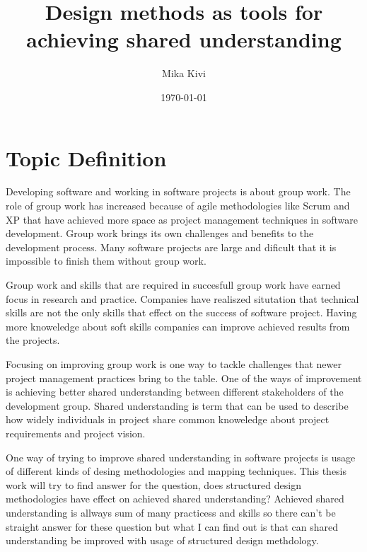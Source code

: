 \documentclass[english]{tktltiki2}
\title{Design methods as tools for achieving shared understanding}
\author{Mika Kivi}
\date{\today}
\theoremstyle{definition}
\theoremstyle{remark}
\begin{document}

\frontmatter      %

\maketitle        %
\makeabstract     %

\tableofcontents  %


\mainmatter       %

\section{Topic Definition}

Developing software and working in software projects is about group work. The role of group work has increased because of agile methodologies like Scrum\cite{scrum} and XP\cite{XP} that have achieved more space as project management techniques in software development. Group work brings its own challenges and benefits to the development process. Many software projects are large and dificult that it is impossible to finish them without group work.

Group work and skills that are required in succesfull group work have earned focus in research and practice. Companies have realiszed situtation that technical skills are not the only skills that effect on the success of software project. Having more knoweledge about soft skills companies can improve achieved results from the projects.

Focusing on improving group work is one way to tackle challenges that newer project management practices bring to the table. One of the ways of improvement is achieving better shared understanding between different stakeholders of the development group. Shared understanding is term that can be used to describe how widely individuals in project share common knoweledge about project requirements and project vision\cite{organizationalStructure}.

One way of trying to improve shared understanding in software projects is usage of different kinds of desing methodologies and mapping techniques. This thesis work will try to find answer for the question, does structured design methodologies have effect on achieved shared understanding? Achieved shared understanding is allways sum of many practicess and skills so there can't be straight answer for these question but what I can find out is that can shared understanding be improved with usage of structured design methdology. 
\end{document}
